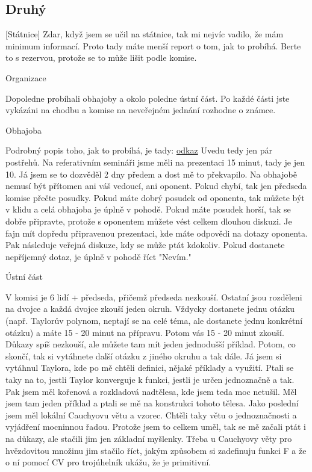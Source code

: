\documentclass[12pt,a4paper]{article}
\begin{document}
\subsection*{Druhý}
[Státnice]  Zdar, když jsem se učil na státnice, tak mi nejvíc vadilo, že mám minimum informací. Proto tady máte menší report o tom, jak to probíhá. Berte to s rezervou, protože se to může lišit podle komise.

Organizace

Dopoledne probíhali obhajoby a okolo poledne ústní část. Po každé části jste vykázáni na chodbu a komise na neveřejném jednání rozhodne o známce. 

Obhajoba

Podrobný popis toho, jak to probíhá, je tady: \href{http://garant.karlin.mff.cuni.cz/stud/bc_szz_obhaj.shtml}{odkaz}
Uvedu tedy jen pár postřehů.  Na referativním semináři jsme měli na prezentaci 15 minut, tady je jen 10. Já jsem se to dozvěděl 2 dny předem a dost mě to překvapilo. Na obhajobě nemusí být přítomen ani váš vedoucí, ani oponent. Pokud chybí, tak jen předseda komise přečte posudky. Pokud máte dobrý posudek od oponenta, tak můžete být v klidu a celá obhajoba je úplně v pohodě. Pokud máte posudek horší, tak se dobře připravte, protože s oponentem můžete vést celkem dlouhou diskuzi. Je fajn mít dopředu připravenou prezentaci, kde máte odpovědi na dotazy oponenta.
Pak následuje veřejná diskuze, kdy se může ptát kdokoliv. Pokud dostanete nepříjemný dotaz, je úplně v pohodě říct "Nevím." 

Ústní část

V komisi je 6 lidí + předseda, přičemž předseda nezkouší. Ostatní jsou rozděleni na dvojce a každá dvojce zkouší jeden okruh. Vždycky dostanete jednu otázku (např. Taylorův polynom, neptají se na celé téma, ale dostanete jednu konkrétní otázku) a máte 15 - 20 minut na přípravu. Potom vás 15 - 20 minut zkouší. Důkazy spíš nezkouší, ale můžete tam mít jeden jednodušší příklad. Potom, co skončí, tak si vytáhnete další otázku z jiného okruhu a tak dále.
Já jsem si vytáhnul Taylora, kde po mě chtěli definici, nějaké příklady a využití. Ptali se taky na to, jestli Taylor konverguje k funkci, jestli je určen jednoznačně a tak. 
Pak jsem měl kořenová a rozkladová nadtělesa, kde jsem teda moc netušil. Měl jsem tam jeden příklad a ptali se mě na konstrukci tohoto tělesa.
Jako poslední jsem měl lokální Cauchyovu větu a vzorec. Chtěli taky větu o jednoznačnosti a vyjádření mocninnou řadou. Protože jsem to celkem uměl, tak se mě začali ptát i na důkazy, ale stačili jim jen základní myšlenky. Třeba u Cauchyovy věty pro hvězdovitou množinu jim stačilo říct, jakým způsobem si zadefinuju funkci F a že o ní pomocí CV pro trojúhelník ukážu, že je primitivní.
\end{document}

